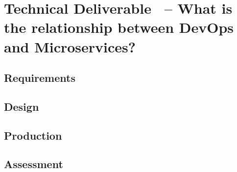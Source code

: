 \section{Technical Deliverable \thetdel\ -- What is the relationship
between DevOps and Microservices?}
{\color{gray}

\subsection{Requirements}
\subsection{Design}
\subsection{Production}
\subsection{Assessment}
}
